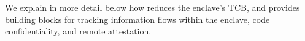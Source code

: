 We explain in more detail below how \sysname{} reduces the enclave's TCB,
and provides building blocks for tracking information flows within the enclave, code confidentiality, and remote attestation.












